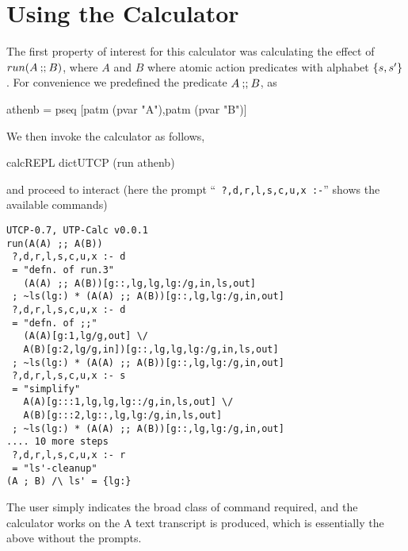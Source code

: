 \section{Using the Calculator}\label{sec:Using}

The first property of interest for this calculator
was calculating the effect of $run(A \mathbin{\mathbf{;\!;}} B)$,
where $A$ and $B$ where atomic action predicates with alphabet $\{{s,s'}\}$.
For convenience we predefined the predicate $A \mathbin{\mathbf{;\!;}} B$, as
\begin{code}
athenb = pseq [patm (pvar "A"),patm (pvar "B")]
\end{code}
We then invoke the calculator as follows,
\begin{code}
calcREPL dictUTCP (run athenb)
\end{code}
and proceed to interact
(here the prompt  ``\texttt{ ?,d,r,l,s,c,u,x :-}''
shows the available commands)
\begin{verbatim}
UTCP-0.7, UTP-Calc v0.0.1
run(A(A) ;; A(B))
 ?,d,r,l,s,c,u,x :- d
 = "defn. of run.3"
   (A(A) ;; A(B))[g::,lg,lg,lg:/g,in,ls,out]
 ; ~ls(lg:) * (A(A) ;; A(B))[g::,lg,lg:/g,in,out]
 ?,d,r,l,s,c,u,x :- d
 = "defn. of ;;"
   (A(A)[g:1,lg/g,out] \/
   A(B)[g:2,lg/g,in])[g::,lg,lg,lg:/g,in,ls,out]
 ; ~ls(lg:) * (A(A) ;; A(B))[g::,lg,lg:/g,in,out]
 ?,d,r,l,s,c,u,x :- s
 = "simplify"
   A(A)[g:::1,lg,lg,lg::/g,in,ls,out] \/
   A(B)[g:::2,lg::,lg,lg:/g,in,ls,out]
 ; ~ls(lg:) * (A(A) ;; A(B))[g::,lg,lg:/g,in,out]
.... 10 more steps
 ?,d,r,l,s,c,u,x :- r
 = "ls'-cleanup"
(A ; B) /\ ls' = {lg:}
\end{verbatim}
The user simply indicates the broad class of command required,
and the calculator works on the
A text transcript is produced,
which is essentially the above
without the prompts.
